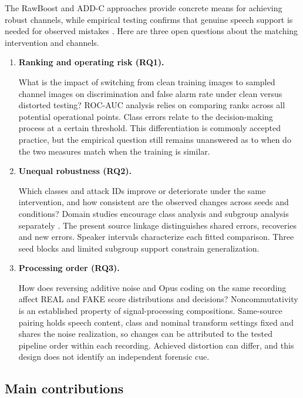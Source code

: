 The RawBoost and ADD-C approaches provide concrete means for achieving robust channels, while empirical testing confirms that genuine speech support is needed for observed mistakes \cite{rawboost,addc,kwok}. Here are three open questions about the matching intervention and channels.

\begin{enumerate}

\item \textbf{Ranking and operating risk (RQ1).}

What is the impact of switching from clean training images to sampled channel images on discrimination and false alarm rate under clean versus distorted testing? ROC-AUC analysis relies on comparing ranks across all potential operational points. Class errors relate to the decision-making process at a certain threshold. This differentiation is commonly accepted practice, but the empirical question still remains unanswered as to when do the two measures match when the training is similar.



\item \textbf{Unequal robustness (RQ2).}

Which classes and attack IDs improve or deteriorate under the same intervention, and how consistent are the observed changes across seeds and conditions? Domain studies encourage class analysis and subgroup analysis separately \cite{kwok,maltby}. The present source linkage distinguishes shared errors, recoveries and new errors. Speaker intervals characterize each fitted comparison. Three seed blocks and limited subgroup support constrain generalization.

\item \textbf{Processing order (RQ3).}

How does reversing additive noise and Opus coding on the same recording affect REAL and FAKE score distributions and decisions? Noncommutativity is an established property of signal-processing compositions. Same-source pairing holds speech content, class and nominal transform settings fixed and shares the noise realization, so changes can be attributed to the tested pipeline order within each recording. Achieved distortion can differ, and this design does not identify an independent forensic cue.

\end{enumerate}

\subsection{Main contributions}

